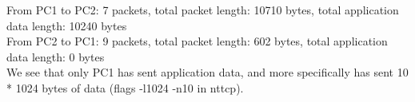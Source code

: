 From PC1 to PC2: 7 packets, total packet length: 10710 bytes, total application data length: 10240 bytes \\

From PC2 to PC1: 9 packets, total packet length: 602 bytes, total application data length: 0 bytes \\

We see that only PC1 has sent application data, and more specifically has sent 10 * 1024 bytes of data (flags -l1024 -n10 in nttcp).
